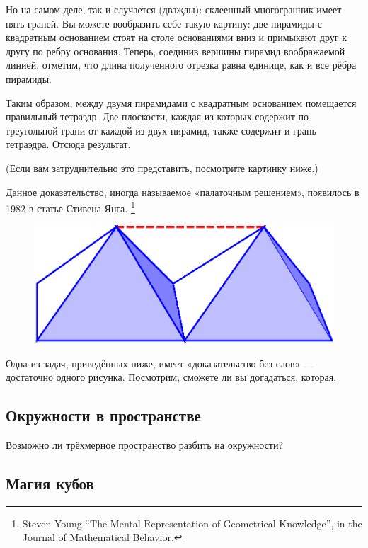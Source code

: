 Но на самом деле, так и случается (дважды):
склеенный многогранник имеет пять граней.
Вы можете вообразить себе такую картину: две пирамиды с квадратным основанием стоят на столе основаниями вниз и примыкают друг к другу по ребру основания.
Теперь, соединив вершины пирамид воображаемой линией, отметим, что длина полученного отрезка равна единице, как и все рёбра пирамиды.

Таким образом, между двумя пирамидами с квадратным основанием помещается правильный тетраэдр.
Две плоскости, каждая из которых содержит по треугольной грани от каждой из двух пирамид, также содержит и грань тетраэдра.
Отсюда результат.
\heart

(Если вам затруднительно это представить, посмотрите картинку ниже.)

Данное доказательство, иногда называемое «палаточным решением», появилось в 1982 в статье Стивена Янга.%
\footnote{Steven Young “The Mental Representation of Geometrical Knowledge”, in the Journal of Mathematical Behavior.}

\begin{figure}[h!]
\centering
\includegraphics[scale=0.55]{Figs/Geometry/pyrs}
\end{figure} 

Одна из задач, приведённых ниже, имеет «доказательство без слов» --- достаточно одного рисунка.
Посмотрим, сможете ли вы догадаться, которая.

\subsection*{Окружности в пространстве}%

Возможно ли трёхмерное пространство разбить на окружности? 

\subsection*{Магия кубов}%

